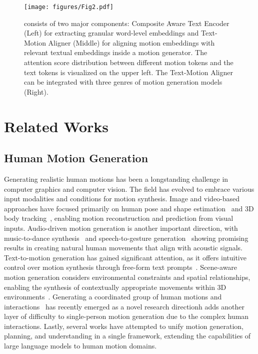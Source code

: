 \begin{figure*}[!t]
    \centering
    \texttt{[image: figures/Fig2.pdf]}
    \vspace{-15pt}
    \caption{{\modulename} consists of two major components: Composite Aware Text Encoder (Left) for extracting granular word-level embeddings and Text-Motion Aligner (Middle) for aligning motion embeddings with relevant textual embeddings inside a motion generator. The attention score distribution between different motion tokens and the text tokens is visualized on the upper left. 
    The Text-Motion Aligner can be integrated with three genres of motion generation models (Right).}
    \vspace{-5pt}
\label{fig:CASIM}
\end{figure*}

\vspace{-5pt}
\section{Related Works} \label{sec:related_works}
\vspace{-3pt}

\subsection{Human Motion Generation}
\vspace{-3pt}
Generating realistic human motions has been a longstanding challenge in computer graphics and computer vision.
The field has evolved to embrace various input modalities and conditions for motion synthesis.
Image and video-based approaches have focused primarily on human pose and shape estimation~\cite{zhao2019semantic} and 3D body tracking~\cite{stathopoulos2024score}, enabling motion reconstruction and prediction from visual inputs.
Audio-driven motion generation is another important direction, with music-to-dance synthesis~\cite{alexanderson2023listen} and speech-to-gesture generation~\cite{chang2022ivi, chang2023importance} 
showing promising results in creating natural human movements that align with acoustic signals.
Text-to-motion generation has gained significant attention, as it offers intuitive control over motion synthesis through free-form text prompts~\cite{Guo_2022_CVPR}.
Scene-aware motion generation considers environmental constraints and spatial relationships, enabling the synthesis of contextually appropriate movements within 3D environments~\cite{cen2024text_scene_motion}.
Generating a coordinated group of human motions and interactions~\cite{chang2024learning, chang2024equivalency} 
has recently emerged as a novel research directionh adds another layer of difficulty to single-person motion generation due to the complex human interactions.
Lastly, several works \cite{li2024unimotion, zhou2024avatargpt} have attempted to unify motion generation, planning, and understanding in a single framework, extending the capabilities of large language models to human motion domains.


